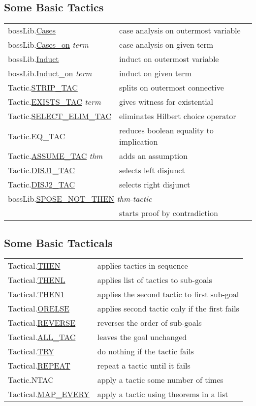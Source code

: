 \documentclass[landscape,10pt]{article}
\newcommand{\hol}[2]{{\sffamily #1.\href{#1.#2.html}{#2}}}
\newcommand{\holnoref}[2]{{\sffamily #1.#2}}
\newcommand{\var}[1]{{\emph{#1}}}
\begin{document}
\begin{multicols}{3}
\subsection*{Some Basic Tactics}
\begin{tabular}{ll}
\hol{bossLib}{Cases} & case analysis on outermost variable \\
\hol{bossLib}{Cases_on} \var{term} & case analysis on given term \\
\hol{bossLib}{Induct} & induct on outermost variable \\
\hol{bossLib}{Induct_on} \var{term} & induct on given term \\
\hol{Tactic}{STRIP_TAC} & splits on outermost connective \\
\hol{Tactic}{EXISTS_TAC} \var{term} & gives witness for existential \\
\hol{Tactic}{SELECT_ELIM_TAC} & eliminates Hilbert choice operator \\
\hol{Tactic}{EQ_TAC} & reduces boolean equality to implication \\
\hol{Tactic}{ASSUME_TAC} \var{thm} & adds an assumption \\
\hol{Tactic}{DISJ1_TAC} & selects left disjunct \\
\hol{Tactic}{DISJ2_TAC} & selects right disjunct \\
\multicolumn{2}{l}{\hol{bossLib}{SPOSE_NOT_THEN} \var{thm-tactic}} \\
& \quad starts proof by contradiction \\
\end{tabular}
\subsection*{Some Basic Tacticals}
\begin{tabular}{ll}
\hol{Tactical}{THEN} & applies tactics in sequence \\
\hol{Tactical}{THENL} & applies list of tactics to sub-goals \\
\hol{Tactical}{THEN1} & applies the second tactic to first sub-goal \\
\hol{Tactical}{ORELSE} & applies second tactic only if the first fails \\
\hol{Tactical}{REVERSE} & reverses the order of sub-goals \\
\hol{Tactical}{ALL_TAC} & leaves the goal unchanged \\
\hol{Tactical}{TRY} & do nothing if the tactic fails \\
\hol{Tactical}{REPEAT} & repeat a tactic until it fails \\
\holnoref{Tactic}{NTAC} & apply a tactic some number of times \\
\hol{Tactical}{MAP_EVERY} & apply a tactic using theorems in a list \\
\end{tabular}

\end{multicols}
\end{document}

